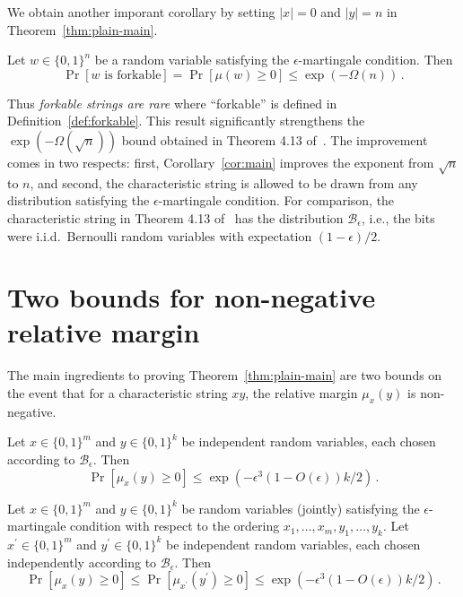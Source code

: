 We obtain another imporant corollary by setting $|x| = 0$ and $|y| = n$ in Theorem~\ref{thm:plain-main}. 
\begin{corollary}\label{coro:forkable-rare}%
  Let $w \in \{0,1\}^n$ be a random variable satisfying the $\epsilon$-martingale condition. Then
  \[
    \Pr[\text{$w$ is forkable}] = \Pr[\mu(w) \geq 0] \leq \exp(-\Omega(n))
    \,.
  \]
\end{corollary}
Thus \emph{forkable strings are rare} 
where ``forkable'' is defined in Definition~\ref{def:forkable}.
This result 
significantly strengthens the $\exp(-\Omega(\sqrt{n}))$ 
bound obtained in Theorem 4.13 of~\cite{KRDO17}. 
The improvement comes in two respects: 
first, Corollary~\ref{cor:main} improves the exponent from $\sqrt{n}$ to $n$, 
and second, the characteristic string is allowed to be drawn 
from any distribution satisfying the $\epsilon$-martingale condition. 
For comparison, the characteristic string in Theorem 4.13 of~\cite{KRDO17} 
has the distribution $\mathcal{B}_\epsilon$, i.e., 
the bits were i.i.d.\ Bernoulli random variables 
with expectation $(1 - \epsilon)/2$.




\section{Two bounds for non-negative relative margin}\label{sec:bounds}
The main ingredients to proving Theorem~\ref{thm:plain-main} 
are two bounds on the event that for a characteristic string $xy$, 
the relative margin $\mu_x(y)$ is non-negative. 

\begin{bound}\label{bound:analytic}
  Let $x \in \{0,1\}^m$ and $y \in \{0,1\}^k$ be independent random
  variables, each chosen according to $\mathcal{B}_\epsilon$. Then
  \[
    \Pr[\mu_x(y) \geq 0] 
      \leq \exp({-\epsilon^3 (1 - O(\epsilon)) k/2})
    \,.
  \]
\end{bound}


\begin{bound}\label{bound:geometric}
  Let $x \in \{0,1\}^m$ and $y \in \{0,1\}^k$ be random variables
  (jointly) satisfying the $\epsilon$-martingale condition with
  respect to the ordering $x_1, \ldots, x_m, y_1, \ldots, y_k$.  Let
  $x^\prime \in \{0,1\}^m$ and $y^\prime \in \{0,1\}^k$ be independent
  random variables, each chosen independently according to
  $\mathcal{B}_\epsilon$.  Then
  \[
    \Pr[\mu_x(y) \geq 0] \leq \Pr[\mu_{x^\prime}(y^\prime) \geq 0]
      \leq \exp({-\epsilon^3 (1 - O(\epsilon)) k/2})
    \,.
  \]
\end{bound}


